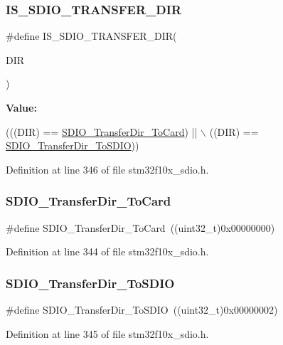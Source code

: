 \subsubsection{\texorpdfstring{I\+S\+\_\+\+S\+D\+I\+O\+\_\+\+T\+R\+A\+N\+S\+F\+E\+R\+\_\+\+D\+IR}{IS\_SDIO\_TRANSFER\_DIR}}
{\footnotesize\ttfamily \#define I\+S\+\_\+\+S\+D\+I\+O\+\_\+\+T\+R\+A\+N\+S\+F\+E\+R\+\_\+\+D\+IR(\begin{DoxyParamCaption}\item[{}]{D\+IR }\end{DoxyParamCaption})}

{\bfseries Value\+:}
\begin{DoxyCode}
(((DIR) == \hyperlink{group___s_d_i_o___transfer___direction_gaef8af0ffa4ea04b3362338d268cc0935}{SDIO\_TransferDir\_ToCard}) || \(\backslash\)
                                   ((DIR) == \hyperlink{group___s_d_i_o___transfer___direction_ga55a6d9613d3e2e7762296b45d0d13222}{SDIO\_TransferDir\_ToSDIO}))
\end{DoxyCode}


Definition at line 346 of file stm32f10x\+\_\+sdio.\+h.

\mbox{\label{group___s_d_i_o___transfer___direction_gaef8af0ffa4ea04b3362338d268cc0935}} 
\subsubsection{\texorpdfstring{S\+D\+I\+O\+\_\+\+Transfer\+Dir\+\_\+\+To\+Card}{SDIO\_TransferDir\_ToCard}}
{\footnotesize\ttfamily \#define S\+D\+I\+O\+\_\+\+Transfer\+Dir\+\_\+\+To\+Card~((uint32\+\_\+t)0x00000000)}



Definition at line 344 of file stm32f10x\+\_\+sdio.\+h.

\mbox{\label{group___s_d_i_o___transfer___direction_ga55a6d9613d3e2e7762296b45d0d13222}} 
\subsubsection{\texorpdfstring{S\+D\+I\+O\+\_\+\+Transfer\+Dir\+\_\+\+To\+S\+D\+IO}{SDIO\_TransferDir\_ToSDIO}}
{\footnotesize\ttfamily \#define S\+D\+I\+O\+\_\+\+Transfer\+Dir\+\_\+\+To\+S\+D\+IO~((uint32\+\_\+t)0x00000002)}



Definition at line 345 of file stm32f10x\+\_\+sdio.\+h.

